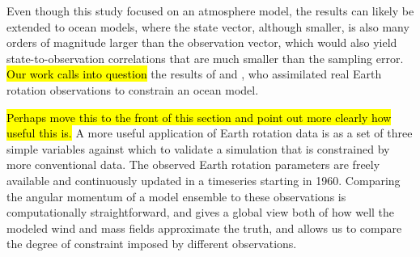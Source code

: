 Even though this study focused on an atmosphere model, the results can likely be extended to ocean models, where the state vector, although smaller, is also many orders of magnitude larger than the observation vector, which would also yield state-to-observation correlations that are much smaller than the sampling error. 
\hl{Our work calls into question} the results of \citet{Saynisch2010,Saynisch2011} and \citet{Saynisch2012}, who assimilated real Earth rotation observations to constrain an ocean model. 

\hl{Perhaps move this to the front of this section and point out more clearly how useful this is.}
A more useful application of Earth rotation data is as a set of three simple variables against which to validate a simulation that is constrained by more conventional data.  
The observed Earth rotation parameters are freely available \citep{iers} and continuously updated in a timeseries starting in 1960. 
Comparing the angular momentum of a model ensemble to these observations is computationally straightforward, and 
gives a global view both of how well the modeled wind and mass fields approximate the truth, and allows us to compare the degree of constraint imposed by different observations. 



